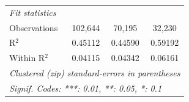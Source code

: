 \begin{tabular}{lccc}
   \midrule
   \emph{Fit statistics}\\
   Observations                                           & 102,644         & 70,195          & 32,230\\  
   R$^2$                                                  & 0.45112         & 0.44590         & 0.59192\\  
   Within R$^2$                                           & 0.04115         & 0.04342         & 0.06161\\  
   \midrule \midrule
   \multicolumn{4}{l}{\emph{Clustered (zip) standard-errors in parentheses}}\\
   \multicolumn{4}{l}{\emph{Signif. Codes: ***: 0.01, **: 0.05, *: 0.1}}\\
\end{tabular}
\par\endgroup
